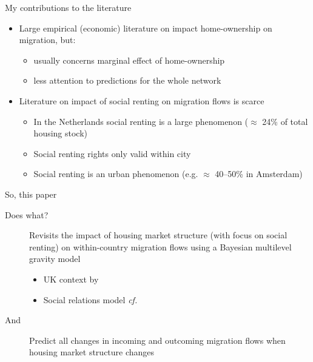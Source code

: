 \documentclass{beamer}
\begin{document}
\begin{frame}{My contributions to the literature}
  \begin{itemize}
  \item Large empirical (economic) literature on impact home-ownership on migration, but:
    \begin{itemize}
    \item usually concerns \alert{marginal} effect of home-ownership
    \item less attention to \alert{predictions} for the whole network\newline
    \end{itemize}
  \item Literature on impact of social renting on migration flows is
    scarce \footnotesize{\citep{de2009homeownership} }
	\begin{itemize}
        \item In the Netherlands social renting is a large phenomenon
          ($\approx$ 24\% of total housing stock)
        \item Social renting rights only valid \alert{within} city
        \item Social renting is an \alert{urban} phenomenon (e.g. $\approx$
          40--50\% in Amsterdam) 
        \end{itemize}
\end{itemize}
\end{frame}

\begin{frame}{So, this paper}
  \begin{description}
  \item[Does what?] \alert{Revisits} the impact of housing market
    structure (with focus on social renting) on within-country
    migration flows using a Bayesian multilevel gravity model
    \begin{footnotesize}
	\begin{itemize}
	\item \footnotesize UK context by \citet{congdon2010random}
	\item \footnotesize Social relations model \emph{cf.} \citet{koster2014food} \newline
\end{itemize}
    \end{footnotesize}
  \item[And] \alert{Predict} all changes in incoming and
    outcoming migration flows when housing market structure changes
\end{description}
\end{frame}
\end{document}
